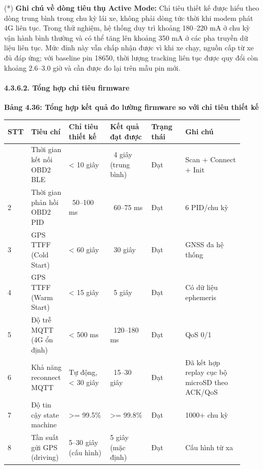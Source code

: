 \documentclass[13pt,a4paper]{extarticle}
\newcounter{none} %
\newcommand{\thesislongtableorignewline}{}
\let\thesislongtableorignewline\\
\renewcommand{\\}{\thesislongtableorignewline\hline}%
\let\\\thesislongtableorignewline
\newcommand{\thesistabletitle}[1]{%
  \begin{center}\textbf{#1}\end{center}%
}
\begin{document}
(*) \textbf{Ghi chú về dòng tiêu thụ Active Mode:} Chỉ tiêu thiết kế
được hiểu theo dòng trung bình trong chu kỳ lái xe, không phải dòng tức
thời khi modem phát 4G liên tục. Trong thử nghiệm, hệ thống duy trì
khoảng 180--220 mA ở chu kỳ vận hành bình thường và có thể tăng lên
khoảng 350 mA ở các pha truyền dữ liệu liên tục. Mức đỉnh này vẫn chấp
nhận được vì khi xe chạy, nguồn cấp từ xe đủ đáp ứng; với baseline pin
18650, thời lượng tracking liên tục được quy đổi còn khoảng 2.6--3.0 giờ
và cần được đo lại trên mẫu pin mới.

\paragraph{4.3.6.2. Tổng hợp chỉ tiêu
firmware}\label{4362-tux1ed5ng-hux1ee3p-chux1ec9-tiuxeau-firmware}

\thesistabletitle{Bảng 4.36: Tổng hợp kết quả đo lường firmware so với chỉ tiêu thiết
kế}

{\def\LTcaptype{none} %
\begin{longtable}{|p{0.06\linewidth}|p{0.14\linewidth}|p{0.17\linewidth}|p{0.17\linewidth}|p{0.14\linewidth}|p{0.24\linewidth}|}
\hline \textbf{STT} & \textbf{Tiêu chí} & \textbf{Chỉ tiêu thiết kế} & \textbf{Kết quả đạt được} & \textbf{Trạng thái} & \textbf{Ghi
chú} \\
\hline
\endhead
\hline
\endlastfoot
1 & Thời gian kết nối OBD2 BLE & \textless{} 10 giây & ~4
giây (trung bình) & Đạt & Scan + Connect + Init \\
2 & Thời gian phản hồi OBD2 PID & ~50--100 ms &
~60--75 ms & Đạt & 6 PID/chu kỳ \\
3 & GPS TTFF (Cold Start) & \textless{} 60 giây & ~30 giây
& Đạt & GNSS đa hệ thống \\
4 & GPS TTFF (Warm Start) & \textless{} 15 giây & ~5 giây
& Đạt & Có dữ liệu ephemeris \\
5 & Độ trễ MQTT (4G ổn định) & \textless{} 500 ms &
~120--180 ms & Đạt & QoS 0/1 \\
6 & Khả năng reconnect MQTT & Tự động, \textless{} 30 giây &
~15--30 giây & Đạt & Đã kết hợp replay cục bộ microSD theo
ACK/QoS \\
7 & Độ tin cậy state machine & \textgreater= 99.5\% & \textgreater=
99.8\% & Đạt & 1000+ chu kỳ \\
8 & Tần suất gửi GPS (driving) & 5--30 giây (cấu hình) & 5 giây (mặc
định) & Đạt & Cấu hình từ xa \\
\end{longtable}
}
\end{document}
